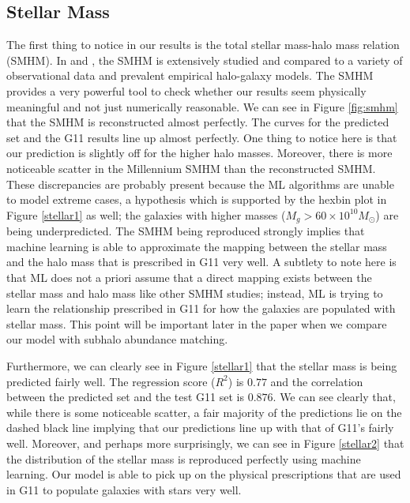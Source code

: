 \documentclass[a4paper,fleqn,usenatbib]{mnras}
\begin{document}
\subsection{Stellar Mass} \label{results_stellar}
\par
The first thing to notice in our results is the total stellar mass-halo mass relation (SMHM). In \citet{behroozi2010comprehensive} and \citet{moster2010constraints}, the SMHM is extensively studied and compared to a variety of observational data and prevalent empirical halo-galaxy models. The SMHM provides a very powerful tool to check whether our results seem physically meaningful and not just numerically reasonable. We can see in Figure \ref{fig:smhm} that the SMHM is reconstructed almost perfectly. The curves for the predicted set and the G11 results line up almost perfectly. One thing to notice here is that our prediction is slightly off for the higher halo masses. Moreover, there is more noticeable scatter in the Millennium SMHM than the reconstructed SMHM. These discrepancies are probably present because the ML algorithms are unable to model extreme cases, a hypothesis which is supported by the hexbin plot in Figure \ref{stellar1} as well; the galaxies with higher masses ($M_g > 60 \times 10^{10} M_{\odot}$) are being underpredicted. The SMHM being reproduced strongly implies that machine learning is able to approximate the mapping between the stellar mass and the halo mass that is prescribed in G11 very well. A subtlety to note here is that ML does not a priori assume that a direct mapping exists between the stellar mass and halo mass like other SMHM studies; instead, ML is trying to learn the relationship prescribed in G11 for how the galaxies are populated with stellar mass. This point will be important later in the paper when we compare our model with subhalo abundance matching. 
	
\par
Furthermore, we can clearly see in Figure \ref{stellar1} that the stellar mass is being predicted fairly well. The regression score ($R^2$) is $0.77$ and the correlation between the predicted set and the test G11 set is $0.876$. We can see clearly that, while there is some noticeable scatter, a fair majority of the predictions lie on the dashed black line implying that our predictions line up with that of G11's fairly well. Moreover, and perhaps more surprisingly, we can see in Figure \ref{stellar2} that the distribution of the stellar mass is reproduced perfectly using machine learning. Our model is able to pick up on the physical prescriptions that are used in G11 to populate galaxies with stars very well.
\end{document}
